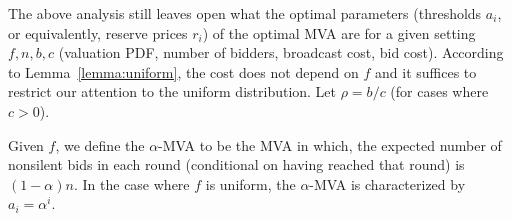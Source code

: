 The above analysis still leaves open what the optimal parameters
(thresholds $a_i$, or equivalently, reserve prices $r_i$) of the optimal
MVA are for a given setting $f, n, b, c$ (valuation PDF, number of bidders,
broadcast cost, bid cost).  According to Lemma~\ref{lemma:uniform}, the
cost does not depend on $f$ and it suffices to restrict our attention to
the uniform distribution.
Let $\rho = b/c$ (for cases where $c>0$).


\begin{definition}
Given $f$, we define the $\alpha$-MVA to be the MVA in which, the expected
number of nonsilent bids in each round (conditional on having reached that
round) is $(1-\alpha)n$.  In the case where $f$ is uniform, the
$\alpha$-MVA is characterized by $a_i = \alpha^i$.
\end{definition}

